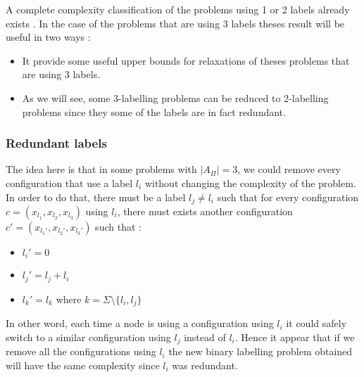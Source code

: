 A complete complexity classification of the problems using 1 or 2 labels already exists \cite{1}. In the case of the problems that are using 3 labels theses result will be useful in two ways :
\begin{itemize}
    \item It provide some useful upper bounds for relaxations of theses problems that are using 3 labels.
    \item As we will see, some 3-labelling problems can be reduced to 2-labelling problems since they some of the labels are in fact redundant.
\end{itemize}
\subsubsection{Redundant labels}
The idea here is that in some problems with $|A_{\Pi}|=3$, we could remove every configuration that use a label $l_i$ without changing the complexity of the problem.\\
In order to do that, there must be a label $l_j\neq l_i$ such that for every configuration $c=(x_{l_1},x_{l_2},x_{l_3})$ using $l_i$, there must exists another configuration $c'=(x_{l_1'},x_{l_2'},x_{l_3'})$ such that : 
\begin{itemize}
    \item $l_i'=0$
    \item $l_j'= l_j+l_i$
    \item $l_k' = l_k$ where $ k = \Sigma \setminus \{l_i,l_j\}$ 
\end{itemize}
In other word, each time a node is using a configuration using $l_i$ it could safely switch to a similar configuration using $l_j$ instead of $l_i$. Hence it appear that if we remove all the configurations using $l_i$ the new binary labelling problem obtained will have the same complexity since $l_i$ was redundant.
